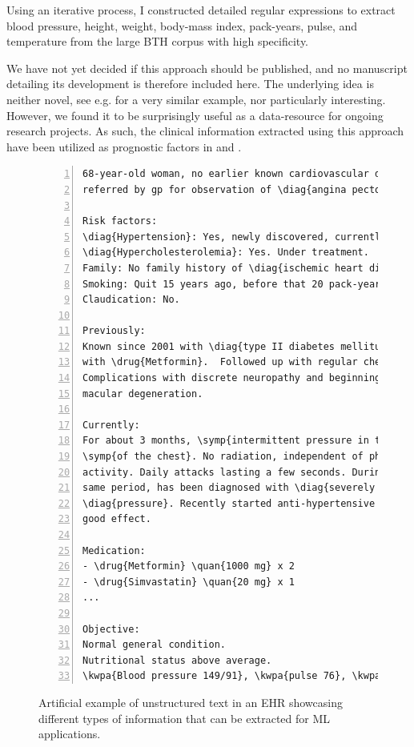 Using an iterative process, 
I constructed detailed regular expressions to 
extract blood pressure, height, weight, body-mass index, pack-years,
pulse, and temperature from the large \ac{BTH} corpus 
with high specificity.

We have not yet decided if this approach should be published,
and no manuscript detailing its development is therefore included here.
The underlying idea is neither novel,
see e.g. \textcite{turchinUsing2006} for a very similar example,
nor particularly interesting.
However, we found it to be surprisingly useful as a data-resource
for ongoing research projects.
As such, the clinical information extracted using this approach
have been utilized as prognostic factors in \studyii{} and \studyiii{}.

\begin{figure}
{%
\newcommand{\diag}[1]{\cbox{color3!60!white}{#1}}
\newcommand{\symp}[1]{\cbox{color4!60!white}{#1}}
\newcommand{\drug}[1]{\cbox{color5!60!white}{#1}}
\newcommand{\quan}[1]{\cbox{color6!60!white}{#1}}
\newcommand{\kwpa}[1]{\cbox{color7!60!white}{#1}}

\begin{Verbatim}[commandchars=\\\{\}, fontsize=\scriptsize, 
    frame=single, framesep=1em, numbers=left, numbersep=3pt]
68-year-old woman, no earlier known cardiovascular disease, 
referred by gp for observation of \diag{angina pectoris}.

Risk factors:
\diag{Hypertension}: Yes, newly discovered, currently well-treated.
\diag{Hypercholesterolemia}: Yes. Under treatment.
Family: No family history of \diag{ischemic heart disease}.
Smoking: Quit 15 years ago, before that 20 pack-years.
Claudication: No.

Previously:
Known since 2001 with \diag{type II diabetes mellitus}, treated 
with \drug{Metformin}.  Followed up with regular checks. 
Complications with discrete neuropathy and beginning 
macular degeneration.

Currently:
For about 3 months, \symp{intermittent pressure in the left side}
\symp{of the chest}. No radiation, independent of physical 
activity. Daily attacks lasting a few seconds. During the 
same period, has been diagnosed with \diag{severely elevated blood}
\diag{pressure}. Recently started anti-hypertensive treatment with
good effect.

Medication:
- \drug{Metformin} \quan{1000 mg} x 2
- \drug{Simvastatin} \quan{20 mg} x 1
...

Objective:
Normal general condition.
Nutritional status above average.
\kwpa{Blood pressure 149/91}, \kwpa{pulse 76}, \kwpa{height 177 cm}, \kwpa{weight 96 kg}
\end{Verbatim}
\caption[Example of unstructed \acs{EHR} data]{%
    Artificial example of unstructured text in an \ac{EHR} showcasing
    different types of information that can be extracted for \acf{ML}
    applications.}
\label{fig:notes-example}
}
\end{figure}%
